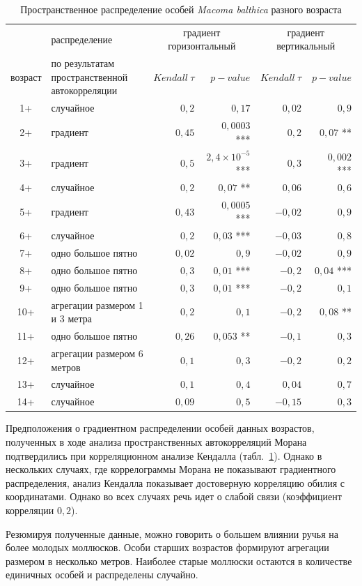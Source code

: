 \begin{table}[h]
		\caption{Пространственное распределение особей {\it Macoma balthica} разного возраста}
		\label{tab:Pala_ages_distribution}
\begin{tabularx}{\linewidth}{|c|X|rr|rr|}
\hline
	& распределение		& \multicolumn{2}{c|}{градиент горизонтальный} & \multicolumn{2}{c|}{градиент вертикальный}   \\ \cline{3-6}
возраст  &  по результатам пространственной автокорреляции  & $Kendall\ \tau$ & $p-value$ & $Kendall\ \tau$ & $p-value$				\\ \hline

1+       & случайное                      & $0,2$	&	$0,17$	&	$0,02$	&	$0,9$                            \\
2+       & градиент                       & $0,45$	&	$0,0003$ ***	&	$0,2$	&	$0,07$ **                   \\
3+       & градиент                       & $0,5$	&	$2,4 \times 10^{-5}$ ***	&	$0,3$	&	$0,002$ ***		 \\
4+       & случайное                      & $0,2$	&	$0,07$ **	&	$0,06$	&	$0,6$                            \\
5+       & градиент                       & $0,43$	&	$0,0005$ ***	&	$-0,02$	&	$0,9$                    \\
6+       & случайное                      & $0,2$	&	$0,03$ ***	&	$-0,03$	&	$0,8$                            \\
7+       & одно большое пятно             & $0,02$	&	$0,9$	&	$-0,02$	&	$0,9$                             \\
8+       & одно большое пятно             & $0,3$	&	$0,01$ ***	&	$-0,2$	&	$0,04$ ***                            \\
9+       & одно большое пятно             & $0,3$	&	$0,01$ ***	&	$-0,2$	&	$0,1$                             \\
10+      & агрегации размером 1 и 3 метра & $0,2$	&	$0,1$	&	$-0,2$	&	$0,08$ **                            \\
11+      & одно большое пятно             & $0,26$	&	$0,053$ **	&	$-0,1$	&	$0,3$                             \\
12+      & агрегации размером 6 метров    & $0,1$	&	$0,3$	&	$-0,2$	&	$0,2$                             \\
13+      & случайное                      & $0,1$	&	$0,4$	&	$0,04$	&	$0,7$                              \\
14+      & случайное                      &  $0,09$	&	$0,5$	&	$-0,15$	&	$0,3$                             \\ \hline
	\end{tabularx}
\end{table}
%
Предположения о градиентном распределении особей данных возрастов, полученных в ходе анализа пространственных автокорреляций Морана подтвердились при корреляционном анализе Кендалла (табл.~\ref{tab:Pala_ages_distribution}).
Однако в нескольких случаях, где коррелограммы Морана не показывают градиентного распределения, анализ Кендалла показывает достоверную корреляцию обилия с координатами. 
Однако во всех случаях речь идет о слабой связи (коэффициент корреляции $0,2$).

Резюмируя полученные данные, можно говорить о большем влиянии ручья на более молодых моллюсков.
Особи старших возрастов формируют агрегации размером в несколько метров.
Наиболее старые моллюски остаются в количестве единичных особей и распределены случайно.

